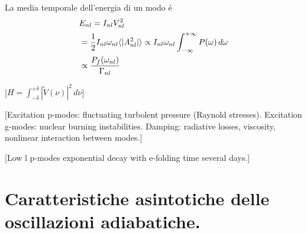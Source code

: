 \documentclass[../main.tex]{subfiles}
\begin{document}
La media temporale dell'energia di un modo \'e
\begin{align}
&E_{nl}=I_{nl}V_{nl}^2\\
&=\frac{1}{2}I_{nl}\omega_{nl}\langle |A_{nl}^2| \rangle\propto I_{nl}\omega_{nl}\int_{-\infty}^{+\infty}{}P(\omega)\,d\omega\\
&\propto\frac{P_f(\omega_{nl})}{\Gamma_{nl}}
\end{align}

[$H=\int_{-\delta}^{+\delta}|\tilde{V}(\nu)|^2\,d\nu$]

\begin{comment}%
[Si ipotizza che le oscillazioni siano eccitate in maniera stocastica dai moti convettivi: la larghezza delle frequenze risonanti \'e determinata dal tempo di smorzamento.]

[Extensive turbolent layers: stars lose all hint of vibrational instability]

[Not self excited: driven to observable amplitude by external process]

[Turbolent convection: source of pulsational energy, emit acustic radiation]

[Stable pulsation: spectrum as that of an ensemble of harmonic oscillator stocastically driven and damped]

[Power spectrum indipendent of l for $l<100$: low degree modes are not influenced by $k_h$. Vertical propagation: superficial layers (low l modes are generated in these strata)]


[Interaction with turbolent convection]

[Radiative transfer (as frequencies rise modes became more sensitive to rapid relaxation time in solar atmosphere)]

[La stabilit\'a dei modi g \'e determinata dalla stabilit\'a convettiva: se non sono presenti regioni di instabilit\'a convettiva i modi g sono stabili ($g_+$), se esistono zone convettivamente instabili esistono anche modi g instabili ($g_{\,-}$).]
\end{comment}

[Excitation p-modes: fluctuating turbolent pressure (Raynold stresses). Excitation g-modes: nuclear burning instabilities. Damping: radiative losses, viscosity, nonlinear interaction between modes.]

[Low l p-modes exponential decay with e-folding time several days.]



{\let\clearpage\relax           %
\chapter{Caratteristiche asintotiche delle oscillazioni adiabatiche.}\label{chap:asyntoticbehavour}
}
\end{document}
